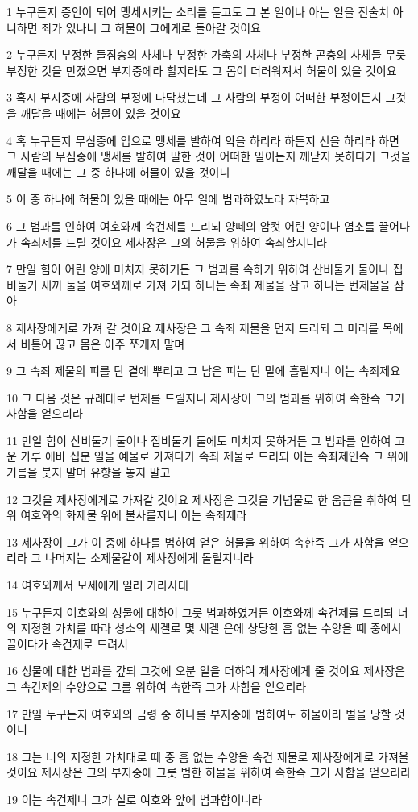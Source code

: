 \par 1 누구든지 증인이 되어 맹세시키는 소리를 듣고도 그 본 일이나 아는 일을 진술치 아니하면 죄가 있나니 그 허물이 그에게로 돌아갈 것이요
\par 2 누구든지 부정한 들짐승의 사체나 부정한 가축의 사체나 부정한 곤충의 사체들 무릇 부정한 것을 만졌으면 부지중에라 할지라도 그 몸이 더러워져서 허물이 있을 것이요
\par 3 혹시 부지중에 사람의 부정에 다닥쳤는데 그 사람의 부정이 어떠한 부정이든지 그것을 깨달을 때에는 허물이 있을 것이요
\par 4 혹 누구든지 무심중에 입으로 맹세를 발하여 악을 하리라 하든지 선을 하리라 하면 그 사람의 무심중에 맹세를 발하여 말한 것이 어떠한 일이든지 깨닫지 못하다가 그것을 깨달을 때에는 그 중 하나에 허물이 있을 것이니
\par 5 이 중 하나에 허물이 있을 때에는 아무 일에 범과하였노라 자복하고
\par 6 그 범과를 인하여 여호와께 속건제를 드리되 양떼의 암컷 어린 양이나 염소를 끌어다가 속죄제를 드릴 것이요 제사장은 그의 허물을 위하여 속죄할지니라
\par 7 만일 힘이 어린 양에 미치지 못하거든 그 범과를 속하기 위하여 산비둘기 둘이나 집비둘기 새끼 둘을 여호와께로 가져 가되 하나는 속죄 제물을 삼고 하나는 번제물을 삼아
\par 8 제사장에게로 가져 갈 것이요 제사장은 그 속죄 제물을 먼저 드리되 그 머리를 목에서 비틀어 끊고 몸은 아주 쪼개지 말며
\par 9 그 속죄 제물의 피를 단 곁에 뿌리고 그 남은 피는 단 밑에 흘릴지니 이는 속죄제요
\par 10 그 다음 것은 규례대로 번제를 드릴지니 제사장이 그의 범과를 위하여 속한즉 그가 사함을 얻으리라
\par 11 만일 힘이 산비둘기 둘이나 집비둘기 둘에도 미치지 못하거든 그 범과를 인하여 고운 가루 에바 십분 일을 예물로 가져다가 속죄 제물로 드리되 이는 속죄제인즉 그 위에 기름을 붓지 말며 유향을 놓지 말고
\par 12 그것을 제사장에게로 가져갈 것이요 제사장은 그것을 기념물로 한 움큼을 취하여 단 위 여호와의 화제물 위에 불사를지니 이는 속죄제라
\par 13 제사장이 그가 이 중에 하나를 범하여 얻은 허물을 위하여 속한즉 그가 사함을 얻으리라 그 나머지는 소제물같이 제사장에게 돌릴지니라
\par 14 여호와께서 모세에게 일러 가라사대
\par 15 누구든지 여호와의 성물에 대하여 그릇 범과하였거든 여호와께 속건제를 드리되 너의 지정한 가치를 따라 성소의 세겔로 몇 세겔 은에 상당한 흠 없는 수양을 떼 중에서 끌어다가 속건제로 드려서
\par 16 성물에 대한 범과를 갚되 그것에 오분 일을 더하여 제사장에게 줄 것이요 제사장은 그 속건제의 수양으로 그를 위하여 속한즉 그가 사함을 얻으리라
\par 17 만일 누구든지 여호와의 금령 중 하나를 부지중에 범하여도 허물이라 벌을 당할 것이니
\par 18 그는 너의 지정한 가치대로 떼 중 흠 없는 수양을 속건 제물로 제사장에게로 가져올 것이요 제사장은 그의 부지중에 그릇 범한 허물을 위하여 속한즉 그가 사함을 얻으리라
\par 19 이는 속건제니 그가 실로 여호와 앞에 범과함이니라

